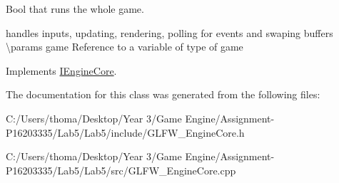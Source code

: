 Bool that runs the whole game. 

handles inputs, updating, rendering, polling for events and swaping buffers \textbackslash{}params game Reference to a variable of type of game 

Implements \mbox{\hyperlink{class_i_engine_core}{I\+Engine\+Core}}.



The documentation for this class was generated from the following files\+:\begin{DoxyCompactItemize}
\item 
C\+:/\+Users/thoma/\+Desktop/\+Year 3/\+Game Engine/\+Assignment-\/\+P16203335/\+Lab5/\+Lab5/include/G\+L\+F\+W\+\_\+\+Engine\+Core.\+h\item 
C\+:/\+Users/thoma/\+Desktop/\+Year 3/\+Game Engine/\+Assignment-\/\+P16203335/\+Lab5/\+Lab5/src/G\+L\+F\+W\+\_\+\+Engine\+Core.\+cpp\end{DoxyCompactItemize}
